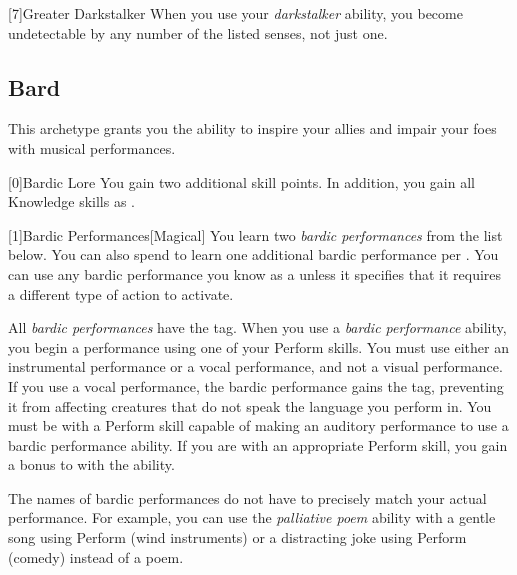         [7]{Greater Darkstalker} When you use your \textit{darkstalker} ability, you become undetectable by any number of the listed senses, not just one.

    \newpage
    \subsection{Bard}
        This archetype grants you the ability to inspire your allies and impair your foes with musical performances.

        [0]{Bardic Lore} You gain two additional skill points.
        In addition, you gain all Knowledge skills as .

        [1]{Bardic Performances}[Magical]
        You learn two \textit{bardic performances} from the list below.
        You can also spend  to learn one additional bardic performance per .
        You can use any bardic performance you know as a  unless it specifies that it requires a different type of action to activate.

        All \textit{bardic performances} have the  tag.
        When you use a \textit{bardic performance} ability, you begin a performance using one of your Perform skills.
        You must use either an instrumental performance or a vocal performance, and not a visual performance.
        If you use a vocal performance, the bardic performance gains the  tag, preventing it from affecting creatures that do not speak the language you perform in.
        You must be  with a Perform skill capable of making an auditory performance to use a bardic performance ability.
        If you are  with an appropriate Perform skill, you gain a  bonus to  with the ability.

        The names of bardic performances do not have to precisely match your actual performance.
        For example, you can use the \textit{palliative poem} ability with a gentle song using Perform (wind instruments) or a distracting joke using Perform (comedy) instead of a poem.


